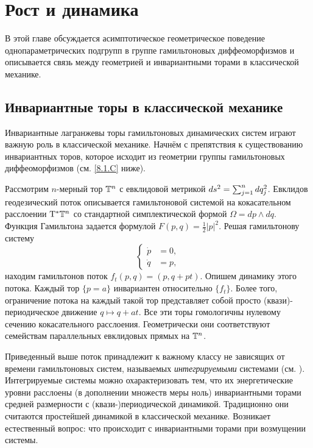 \chapter{Рост и динамика}

В этой главе обсуждается асимптотическое геометрическое поведение
однопараметрических подгрупп в группе гамильтоновых диффеоморфизмов и
описывается связь между геометрией и инвариантными торами в
классической механике. 

\section{Инвариантные торы в классической механике}

Инвариантные лагранжевы торы гамильтоновых динамических систем играют
важную роль в классической механике. 
Начнём с препятствия к существованию инвариантных торов, которое
исходит из геометрии группы гамильтоновых диффеоморфизмов
(см. \ref{8.1.C} ниже). 

Рассмотрим $n$-мерный тор $\mathbb{T}^n$ с евклидовой метрикой $ds^2 \z=
\sum^n_{j = 1} dq_j^2$. 
Евклидов геодезический поток описывается гамильтоновой системой на
кокасательном расслоении $\mathrm{T}^\ast \mathbb{T}^n$ со стандартной симплектической
формой $\Omega = dp \wedge dq$. 
Функция Гамильтона задается формулой $F (p, q) = \tfrac12 | p |^2$.
Решая гамильтонову систему 
\[
\begin{cases}
\dot p &= 0,\\
\dot q &= p,
\end{cases}
\]
находим гамильтонов поток $f_t (p, q) = (p, q + pt)$.
Опишем динамику этого потока.
Каждый тор $\{p = a\}$ инвариантен относительно $\{f_t\}$. 
Более того, ограничение потока на каждый такой тор представляет собой
просто (квази)-периодическое движение $q \mapsto q + at$. 
Все эти торы гомологичны нулевому сечению кокасательного расслоения.
Геометрически они соответствуют семействам параллельных евклидовых
прямых на $\mathbb{T}^n$. 

Приведенный выше поток принадлежит к важному классу не зависящих от
времени гамильтоновых систем, называемых \emph{интегрируемыми} системами
(см. \cite{Ar}). 
Интегрируемые системы можно охарактеризовать тем, что их
энергетические уровни расслоены (в дополнении множеств меры ноль)
инвариантными торами средней размерности с (квази-)периодической
динамикой. 
Традиционно они считаются простейшей динамикой в классической механике.
Возникает естественный вопрос: что происходит с инвариантными торами
при возмущении системы. 

